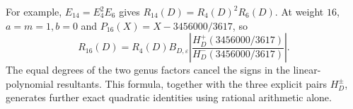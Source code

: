 For example, $E_{14}=E_4^2E_6$ gives
$R_{14}(D)=R_4(D)^2R_6(D)$.
At weight $16$, $a=m=1,b=0$ and
$P_{16}(X)=X-3456000/3617$, so
\[
 R_{16}(D)=R_4(D)B_{D,\varepsilon}
    \left|\frac{H_D^+(3456000/3617)}
                 {H_D^-(3456000/3617)}\right|.
\]
The equal degrees of the two genus factors cancel the signs in the
linear-polynomial resultants. This formula, together with the three
explicit pairs $H_D^\pm$, generates further exact quadratic identities
using rational arithmetic alone.
